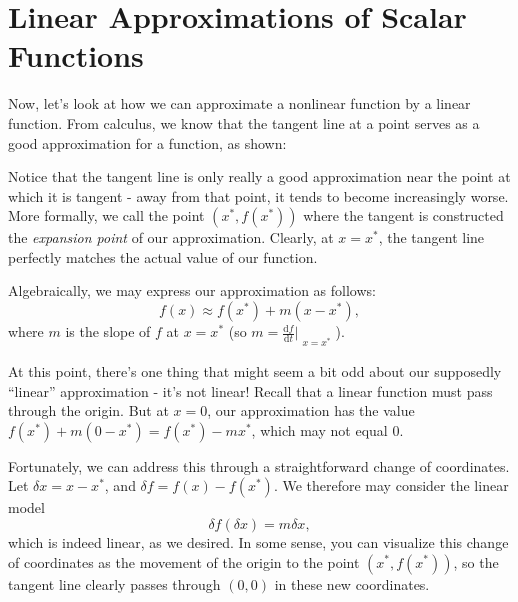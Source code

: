 \documentclass[letterpaper]{article}
\theoremstyle{remark}
\newcommand{\dt}{\mathrm{d}t}
\newcommand{\df}{\mathrm{d}f}
\begin{document}
\section{Linear Approximations of Scalar Functions}
Now, let's look at how we can approximate a nonlinear function by a linear function. From calculus, we know that the tangent line at a point serves as a good approximation for a function, as shown:
\begin{center}
\end{center}

Notice that the tangent line is only really a good approximation near the point at which it is tangent - away from that point, it tends to become increasingly worse. More formally, we call the point $(x^*, f(x^*))$ where the tangent is constructed the \emph{expansion point} of our approximation. Clearly, at $x = x^*$, the tangent line perfectly matches the actual value of our function.

Algebraically, we may express our approximation as follows:
\[
    f(x) \approx f(x^*) + m(x - x^*),
\]
where $m$ is the slope of $f$ at $x = x^*$ (so $m = \frac{\df}{\dt}\Bigr|_{\substack{x=x^*}}$).

At this point, there's one thing that might seem a bit odd about our supposedly ``linear'' approximation - it's not linear! Recall that a linear function must pass through the origin. But at $x = 0$, our approximation has the value $f(x^*) + m(0 - x^*) = f(x^*) - mx^*$, which may not equal $0$.

Fortunately, we can address this through a straightforward change of coordinates. Let $\delta x = x - x^*$, and $\delta f = f(x) - f(x^*)$. We therefore may consider the linear model
\[
    \delta f(\delta x) = m\delta x,
\]
which is indeed linear, as we desired. In some sense, you can visualize this change of coordinates as the movement of the origin to the point $(x^*, f(x^*))$, so the tangent line clearly passes through $(0, 0)$ in these new coordinates.
\end{document}

